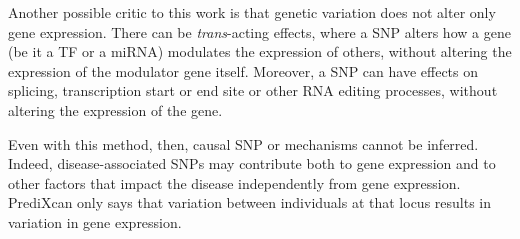 \documentclass[../main.tex]{subfiles}
\begin{document}
Another possible critic to this work is that genetic variation does not 
alter only gene expression. There can be \textit{trans}-acting effects, 
where a SNP alters how a gene (be it a TF or a miRNA) modulates the 
expression of others, without altering the expression of the modulator 
gene itself. Moreover, a SNP can have effects on splicing, transcription 
start or end site or other RNA editing processes, without altering the 
expression of the gene.

Even with this method, then, causal SNP or mechanisms cannot be 
inferred. Indeed, disease-associated SNPs may contribute both to gene 
expression and to other factors that impact the disease independently 
from gene expression. PrediXcan  only says that variation between 
individuals at that locus results in variation in gene expression.
\end{document}
